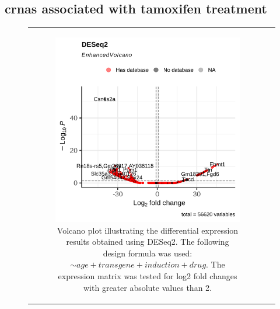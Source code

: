 \subsection{\Glspl{crna} associated with tamoxifen treatment}

\begin{figure}[H] \begin{tabular}{cc}
        \begin{subfigure}{0.5\textwidth} \centering

            \includegraphics[width=\linewidth]{chapters/4_results_and_discussion/figures/dea/deseq2/tamoxifen/volcano.png}
            \caption{Volcano plot illustrating the differential expression
                results obtained using DESeq2.
                The following design formula was used: $\sim age + transgene + induction +
                    drug$.
                The expression matrix was tested for log2 fold changes with greater absolute
                values than 2.
            }
            \label{fig:tamoxifen_volcano_deseq2}
        \end{subfigure}
        \begin{subfigure}{0.5\textwidth}
            \centering


\end{subfigure}
\end{tabular}
\end{figure}
